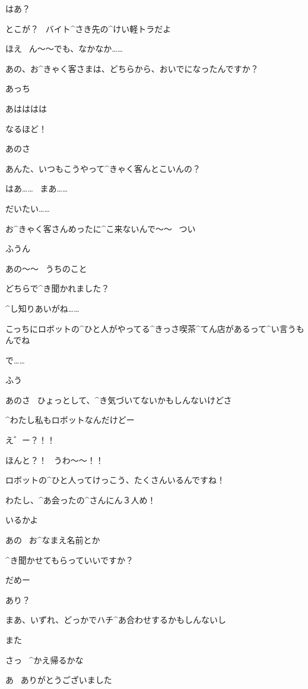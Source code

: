 \Maruko はあ？

\Maruko とこが？
\ バイト^{さき}{先}の^{けい}{軽}トラだよ

\Alpha ほえ
\ ん〜〜でも、なかなか……

\page[64]
\Alpha あの、お^{きゃく}{客}さまは、どちらから、おいでになったんですか？

\Maruko あっち

\Alpha あはははは

\Alpha なるほど！

\Maruko あのさ

\Maruko あんた、いつもこうやって^{きゃく}{客}んとこいんの？

\Alpha はあ……
\ まあ……

\Alpha だいたい……

\page[65]
\Alpha お^{きゃく}{客}さんめったに^{こ}{来}ないんで〜〜
\ つい

\Maruko ふうん

\Alpha あの〜〜
\ うちのこと

\Alpha どちらで^{き}{聞}かれました？

\Maruko ^{し}{知}りあいがね……

\Maruko こっちにロボットの^{ひと}{人}がやってる^{きっさ}{喫茶}^{てん}{店}があるって^{い}{言}うもんでね

\page[66]
\Maruko で……

\Maruko ふう

\Maruko あのさ
\ ひょっとして、^{き}{気}づいてないかもしんないけどさ

\Maruko ^{わたし}{私}もロボットなんだけどー

\Alpha え゛ー？！！

\Alpha ほんと？！
\ うわ〜〜！！

\page[67]
\Alpha ロボットの^{ひと}{人}ってけっこう、たくさんいるんですね！

\Alpha わたし、^{あ}{会}ったの^{さんにん}{３人}め！

\Maruko いるかよ

\Alpha あの
\ お^{なまえ}{名前}とか

\Alpha ^{き}{聞}かせてもらっていいですか？

\Maruko だめー

\Alpha あり？

\page[68]
\Maruko まあ、いずれ、どっかでハチ^{あ}{合}わせするかもしんないし

\Maruko また

\Maruko さっ
\ ^{かえ}{帰}るかな

\Alpha あ
\ ありがとうございました

